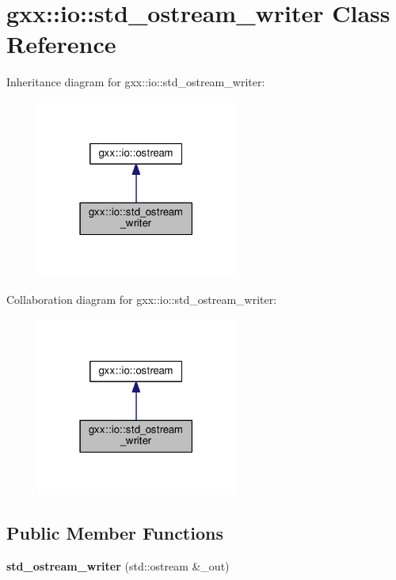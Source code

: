 \hypertarget{classgxx_1_1io_1_1std__ostream__writer}{}\section{gxx\+:\+:io\+:\+:std\+\_\+ostream\+\_\+writer Class Reference}
\label{classgxx_1_1io_1_1std__ostream__writer}


Inheritance diagram for gxx\+:\+:io\+:\+:std\+\_\+ostream\+\_\+writer\+:
\nopagebreak
\begin{figure}[H]
\begin{center}
\leavevmode
\includegraphics[width=186pt]{classgxx_1_1io_1_1std__ostream__writer__inherit__graph}
\end{center}
\end{figure}


Collaboration diagram for gxx\+:\+:io\+:\+:std\+\_\+ostream\+\_\+writer\+:
\nopagebreak
\begin{figure}[H]
\begin{center}
\leavevmode
\includegraphics[width=186pt]{classgxx_1_1io_1_1std__ostream__writer__coll__graph}
\end{center}
\end{figure}
\subsection*{Public Member Functions}
\begin{DoxyCompactItemize}
\item 
{\bfseries std\+\_\+ostream\+\_\+writer} (std\+::ostream \&\+\_\+out)\hypertarget{classgxx_1_1io_1_1std__ostream__writer_ab54f5177e5caa86ea56653e10d5fc03f}{}\label{classgxx_1_1io_1_1std__ostream__writer_ab54f5177e5caa86ea56653e10d5fc03f}

\end{DoxyCompactItemize}
